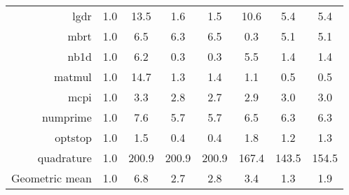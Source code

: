 \begin{tabular}{|r|c|ccc|ccc|}
lgdr           & 1.0     & 13.5                   & 1.6                     & 1.5                             & 10.6                         & 5.4                      & 5.4                              \\
mbrt           & 1.0     & 6.5                    & 6.3                     & 6.5                             & 0.3                          & 5.1                      & 5.1                              \\
nb1d           & 1.0     & 6.2                    & 0.3                     & 0.3                             & 5.5                          & 1.4                      & 1.4                              \\
matmul         & 1.0     & 14.7                   & 1.3                     & 1.4                             & 1.1                          & 0.5                      & 0.5                              \\
mcpi           & 1.0     & 3.3                    & 2.8                     & 2.7                             & 2.9                          & 3.0                        & 3.0                                \\
numprime       & 1.0     & 7.6                    & 5.7                     & 5.7                             & 6.5                          & 6.3                      & 6.3                              \\
optstop        & 1.0     & 1.5                    & 0.4                     & 0.4                             & 1.8                          & 1.2                      & 1.3                              \\
quadrature     & 1.0     & 200.9                  & 200.9                   & 200.9                           & 167.4                        & 143.5                    & 154.5                            \\ \hline
Geometric mean & 1.0     & 6.8                    & 2.7                     & 2.8                             & 3.4                          & 1.3                      & 1.9  
\\ \hline                           
\end{tabular}
